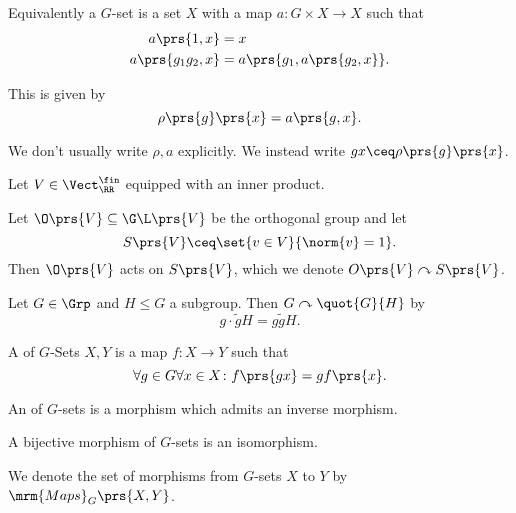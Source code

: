 \documentclass[10pt,a4paper,twoside,openany,hidelinks]{book}
\begin{document}
\begin{remark}
Equivalently a $G$-set is a set $X$ with a map $a \colon G \times X \to X$ such that
\begin{align*}
a\prs{1, x} &= x \\
a\prs{g_1 g_2, x} &= a\prs{g_1, a\prs{g_2, x}} \text{.}
\end{align*}

This is given by
\[\rho\prs{g}\prs{x} = a\prs{g, x} \text{.}\]
\end{remark}

\begin{notation}
We don't usually write $\rho, a$ explicitly. We instead write $gx \ceq \rho\prs{g}\prs{x}$.
\end{notation}

\newcommand{\acts}{\curvearrowright}

\begin{example}
Let $V \in \Vect_\RR^{\fin}$ equipped with an inner product.

Let $\O\prs{V} \subseteq \G\L\prs{V}$ be the orthogonal group and let
\[S\prs{V} \ceq \set{v \in V}{\norm{v} = 1} \text{.}\]
Then $\O\prs{V}$ acts on $S\prs{V}$, which we denote
$O\prs{V} \acts S\prs{V}$.
\end{example}

\begin{example}
Let $G \in \Grp$ and $H \leq G$ a subgroup. Then
$G \acts \quot{G}{H}$ by
\[g \cdot \tilde{g} H = g \tilde{g} H \text{.}\]
\end{example}

\begin{definition}
A  of $G$-Sets $X, Y$ is a map $f \colon X \to Y$ such that
\[\forall g \in G \forall x \in X \colon f\prs{gx} = g f\prs{x} \text{.}\]
\end{definition}

\begin{definition}
An  of $G$-sets is a morphism which admits an inverse morphism.
\end{definition}

\begin{exercise}
A bijective morphism of $G$-sets is an isomorphism.
\end{exercise}

\newcommand{\Maps}{\mrm{Maps}}

\begin{notation}
We denote the set of morphisms from $G$-sets $X$ to $Y$ by $\Maps_G\prs{X,Y}$.
\end{notation}
\end{document}
